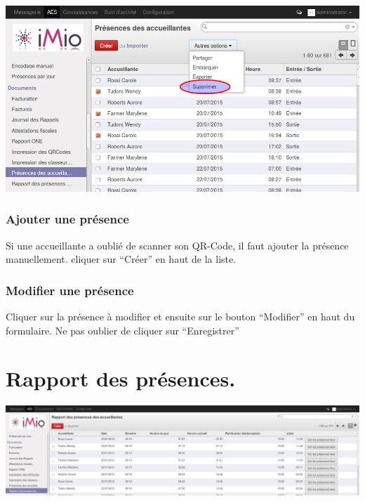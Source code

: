 \documentclass[letterpaper,10pt,english]{sphinxmanual}
\begin{document}
\includegraphics{accueillante_liste_des_presences_delete.png}


\subsubsection{Ajouter une présence}
\label{accueillantes:ajouter-une-presence}
Si une accueillante a oublié de scanner son QR-Code, il faut ajouter la présence manuellement.
cliquer sur ``Créer'' en haut de la liste.


\subsubsection{Modifier une présence}
\label{accueillantes:modifier-une-presence}
Cliquer sur la présence à modifier et ensuite sur le bouton ``Modifier'' en haut du formulaire.
Ne pas oublier de cliquer sur ``Enregistrer''


\section{Rapport des présences.}
\label{accueillantes:rapport-des-presences}
\includegraphics{accueillante_rapport_des_presences.png}
\end{document}
